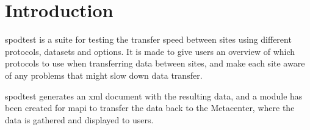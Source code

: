 \section{Introduction}
\gls{spodtest} is a suite for testing the transfer speed between sites using 
different protocols, datasets and options. It is made to give users an overview
of which protocols to use when transferring data between sites, and make each
site aware of any problems that might slow down data transfer.  

\gls{spodtest} generates an \gls{xml} document with the resulting data, and a
module has been created for \gls{mapi} \cite{mapidoc} to transfer the data back
to the Metacenter, where the data is gathered and displayed to users.
